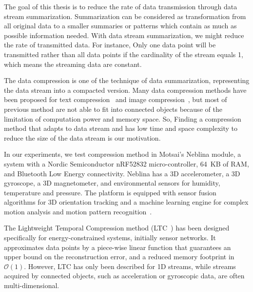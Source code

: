 

The goal of this thesis is to reduce the rate of data transmission through data
stream summarization. Summarization can be considered as transformation from all
original data to a smaller summaries or patterns which contain as much as
possible information needed. With data stream summarization, we might reduce the
rate of transmitted data. For instance, Only one data point will be transmitted
rather than all data points if the cardinality of the stream equals 1, which
means the streaming data are constant. 

The data compression is one of the technique of data summarization, representing
the data stream into a compacted version. Many data compression methods have
been proposed for text compression~\cite{shanmugasundaram2011comparative,
sayood2017introduction} and image compression~\cite{shum2003survey,
zaineldin2015image}, but most of previous method are not able to fit into
connected objects because of the limitation of computation power and memory
space. So, Finding a compression method that adapts to data stream and has low
time and space complexity to reduce the size of the data stream is our
motivation.

In our experiments, we test compression method in Motsai's Neblina module, a
system with a Nordic Semiconductor nRF52832 micro-controller, 64~KB of RAM, and
Bluetooth Low Energy connectivity. Neblina has a 3D accelerometer, a 3D
gyroscope, a 3D magnetometer, and environmental sensors for humidity,
temperature and pressure. The platform is equipped with sensor fusion algorithms
for 3D orientation tracking and a machine learning engine for complex motion
analysis and motion pattern recognition~\cite{sarbishei2016accuracy}.





The Lightweight Temporal Compression method
(LTC~\cite{schoellhammer2004lightweight}) has been designed  specifically for
energy-constrained systems, initially sensor networks.  It approximates data
points by a piece-wise linear function that  guarantees an upper bound on the
reconstruction error, and a reduced  memory footprint in $\mathcal{O}(1)$.
However, LTC has only been  described for 1D streams, while streams acquired by
connected objects, such as  acceleration or gyroscopic data, are often
multi-dimensional. 


